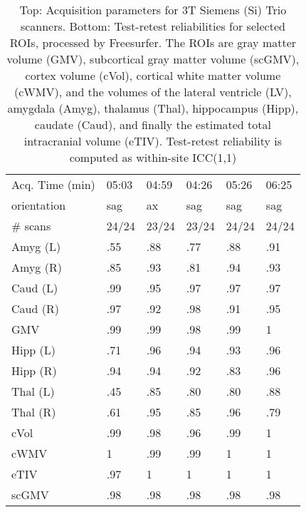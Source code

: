 \documentclass{article}
\begin{document}
\begin{table}
{\begin{tabular}{llllll}
Acq. Time (min)       &           05:03 &           04:59 &           04:26 &           05:26 &           06:25 \\
orientation           &                sag &                 ax &                sag &                sag &                sag \\
\# scans & 24/24 & 23/24 & 23/24 & 24/24 & 24/24 \\
\midrule
Amyg (L)              &               .55 &               .88 &               .77 &               .88 &               .91 \\
Amyg (R)              &               .85 &               .93 &               .81 &               .94 &               .93 \\
Caud (L)              &               .99 &               .95 &               .97 &               .97 &               .97 \\
Caud (R)              &               .97 &               .92 &               .98 &               .91 &               .95 \\
GMV                   &               .99 &               .99 &               .98 &               .99 &               1   \\
Hipp (L)              &               .71 &               .96 &               .94 &               .93 &               .96 \\
Hipp (R)              &               .94 &               .94 &               .92 &               .83 &               .96 \\
Thal (L)              &               .45 &               .85 &               .80 &               .80 &               .88 \\
Thal (R)              &               .61 &               .95 &               .85 &               .96 &               .79 \\
cVol                  &               .99 &               .98 &               .96 &               .99 &               1   \\
cWMV                  &               1   &               .99 &               .99 &               1   &               1   \\
eTIV                  &               .97 &               1   &               1   &               1   &               1   \\
scGMV                 &               .98 &               .98 &               .98 &               .98 &               .98 \\
\bottomrule
\end{tabular}}
\fi
\caption{Top: Acquisition parameters for 3T Siemens (Si) Trio scanners. Bottom: Test-retest reliabilities for selected ROIs, processed by Freesurfer. The ROIs are gray matter volume (GMV), subcortical gray matter volume (scGMV), cortex volume (cVol), cortical white matter volume (cWMV), and the volumes of the lateral ventricle (LV), amygdala (Amyg), thalamus (Thal), hippocampus (Hipp), caudate (Caud), and finally the estimated total intracranial volume (eTIV). Test-retest reliability is computed as within-site ICC(1,1)} 
\label{tab:acquisition4}

\end{table}
\end{document}
